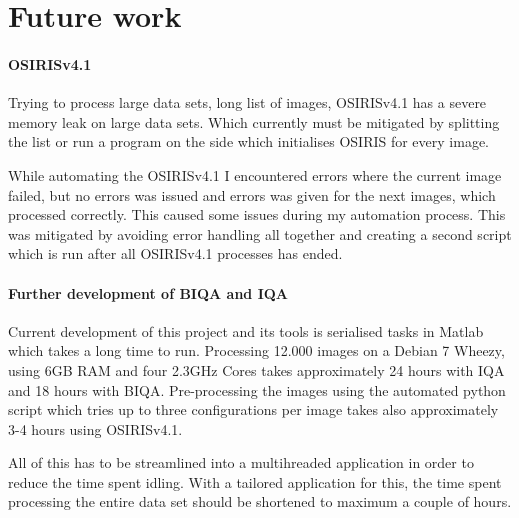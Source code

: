 \section{Future work}

\paragraph{OSIRISv4.1}
Trying to process large data sets, long list of images, OSIRISv4.1 has a severe 
memory leak on large data sets. Which currently must be mitigated by splitting 
the list or run a program on the side which initialises OSIRIS for every image.

While automating the OSIRISv4.1 I encountered errors where the current image
failed, but no errors was issued and errors was given for the next images, which
processed correctly.  This caused some issues during my automation process.
This was mitigated by avoiding error handling all together and creating a second
script which is run after all OSIRISv4.1 processes has ended.


\paragraph{Further development of BIQA and IQA}
Current development of this project and its tools is serialised tasks in Matlab
which takes a long time to run.  Processing 12.000 images on a Debian 7 Wheezy,
using 6GB RAM and four 2.3GHz Cores takes approximately 24 hours with IQA and 18
hours with BIQA.  Pre-processing the images using the automated python script
which tries up to three configurations per image takes also approximately 3-4
hours using OSIRISv4.1.

All of this has to be streamlined into a multihreaded application in order to
reduce the time spent idling. With a tailored application for this, the time
spent processing the entire data set should be shortened to maximum a couple of
hours.



